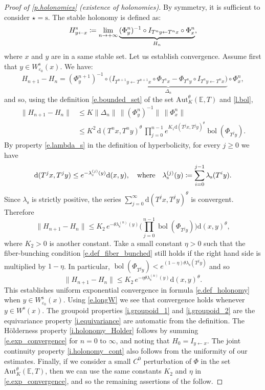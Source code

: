 \documentclass[JEP,XML,SOM,Unicode]{cedram}
\def\vcentcolon{\mathrel{\mathop\ordinarycolon}}
\providecommand\ordinarycolon{:}
\providecommand*\coloneqq{\vcentcolon\mathrel{\mkern-1.2mu}=}
\theoremstyle{plain}
\theoremstyle{definition}
\newcommand{\EE}{\mathbb{E}}
\newcommand{\dd}{\mathrm{d}}
\renewcommand{\ss}{\mathrm{s}}
\newcommand{\Aut}{\mathrm{Aut}}
\DeclareMathOperator{\bol}{bol}
\let\epsilon\varepsilon
\begin{document}
\begin{proof}[Proof of \cref{p.holonomies} (existence of holonomies)]
By symmetry, it is sufficient to consider $\star = \ss$.
The stable holonomy is defined as:
\begin{equation}\label{e.def_holonomy}
H^\ss_{y \gets x} \coloneqq \lim_{n \to + \infty} \underbrace{(\Phi_y^n)^{-1} \circ I_{T^n y \gets T^n x} \circ \Phi_x^n}_{H_n},
\end{equation}
where $x$ and $y$ are in a same stable set.
Let us establish convergence.
Assume first that $y \in W^\ss_{\epsilon_0}(x)$.
We have:
\[
H_{n+1} - H_n = (\Phi_y^{n+1})^{-1} \circ \underbrace{\big( I_{T^{n+1} y \gets T^{n+1} x} \circ \Phi_{T^n x} - \Phi_{T^n y} \circ I_{T^n y \gets T^n x} \big)}_{\Delta_n} \circ \Phi_x^n,
\]
and so, using the definition \eqref{e.bounded_set} of the set $\Aut^\theta_K(\EE,T)$ and \cref{l.bol},
\begin{align*}
\|H_{n+1} - H_n\|
&\le K \|\Delta_n\| \, \| (\Phi_y^n)^{-1}\| \, \|\Phi_x^n\| \\
&\le K^2 \, \dd(T^n x, T^n y)^\theta \, \prod_{j=0}^{n-1} e^{K_1 \dd(T^j x, T^j y)^\theta} \bol(\Phi_{T^j y}).
\end{align*}
By property \eqref{e.lambda_s} in the definition of hyperbolicity, for every $j \ge 0$ we have
\[
\dd(T^j x, T^j y) \le e^{-\lambda_\ss^{(j)}(y)} \dd(x,y), \quad \text{where} \quad
\lambda_\ss^{(j)}(y) \coloneqq \sum_{i=0}^{j-1}\lambda_\ss(T^i y).
\]
Since $\lambda_\ss$ is strictly positive, the series $\sum_{j=0}^\infty \dd(T^j x, T^j y)^\theta$ is convergent.
Therefore
\[
\|H_{n+1} - H_n\|
\le K_2 \, e^{-\theta \lambda_\ss^{(n)}(y)} \biggl( \prod_{j=0}^{n-1} \bol(\Phi_{T^j y}) \biggr) \dd(x,y)^\theta,
\]
where $K_2>0$ is another constant.
Take a small constant $\eta>0$ such that the fiber-bunching condition \eqref{e.def_fiber_bunched} still holds if the right hand side is multiplied by $1-\eta$.
In particular, $\bol(\Phi_{T^j y}) < e^{(1-\eta)\theta\lambda_\ss(T^j y)}$ and so
\begin{equation}\label{e.exp_convergence}
\|H_{n+1} - H_n\|
\le K_2 \, e^{-\eta \theta \lambda_\ss^{(n)}(y)} \dd(x,y)^\theta.
\end{equation}
This establishes uniform exponential convergence in formula \eqref{e.def_holonomy} when $y \in W^\ss_{\epsilon_0}(x)$.
Using \eqref{e.longW} we see that convergence holds whenever $y \in W^\ss(x)$.
The groupoid properties \eqref{i.groupoid_1} and \eqref{i.groupoid_2} are the equivariance property \eqref{i.equivariance} are automatic from the definition.
The Hölderness property \eqref{i.holonomy_Holder} follows by summing \eqref{e.exp_convergence} for $n=0$ to $\infty$, and noting that $H_0 = I_{y\gets x}$.
The joint continuity property \eqref{i.holonomy_cont} also follows from the uniformity of our estimates.
Finally, if we consider a small $C^0$ perturbation of $\Phi$ in the set $\Aut^\theta_K(\EE,T)$, then we can use the same constants $K_2$ and $\eta$ in \eqref{e.exp_convergence}, and so the remaining assertions of the  follow.
\end{proof}
\end{document}
